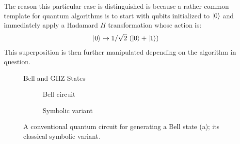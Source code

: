 \documentclass[sigplan,screen]{acmart}
\theoremstyle{definition}
\begin{document}
The reason this particular case is distinguished is because a rather
common template for quantum algorithms is to start with qubits
initialized to $\ket{0}$ and immediately apply a Hadamard $H$ transformation
whose action is:
\[
  \ket{0} \mapsto 1/\sqrt{2} ~(\ket{0} + \ket{1})
\]
This superposition is then further manipulated depending on the
algorithm in question.

\begin{figure}[b]
\begin{center}
\qquad\qquad
{}
\end{center}
\caption{\label{fig:bell2}Bell and GHZ States}
\end{figure}

\begin{figure}[t]
  \centering
\begin{subfigure}[b]{.25\textwidth}
    \centering
\caption{\label{fig:bellqcore}Bell circuit}
\end{subfigure}
\qquad\qquad
\begin{subfigure}[b]{.25\textwidth}
    \centering
\caption{\label{fig:bellccore}Symbolic variant}
\end{subfigure}
\caption{\label{fig:bellall}A conventional quantum circuit for
  generating a Bell state (a); its classical symbolic variant.}
\end{figure}
\end{document}
